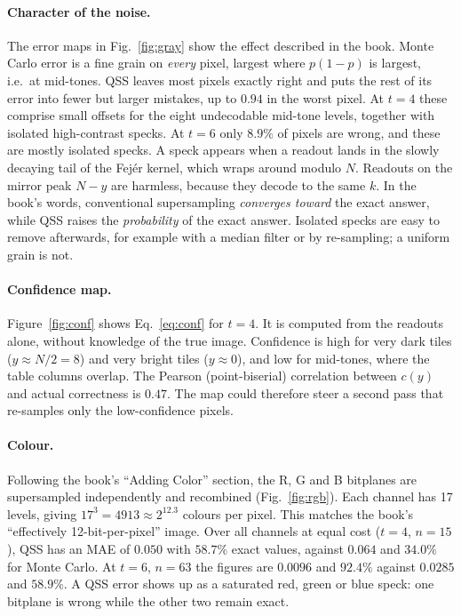 \documentclass[10pt,twocolumn,a4paper]{article}
\begin{document}
\paragraph{Character of the noise.}
The error maps in Fig.~\ref{fig:gray} show the effect described in the
book. Monte Carlo error is a fine grain on \emph{every} pixel, largest where
$p(1-p)$ is largest, i.e.\ at mid-tones. QSS leaves most pixels exactly right
and puts the rest of its error into fewer but larger mistakes, up to $0.94$
in the worst pixel. At $t=4$ these comprise small offsets for the eight
undecodable mid-tone levels, together with isolated high-contrast specks.
At $t=6$ only $8.9\%$ of pixels are wrong, and these are mostly isolated
specks. A speck appears when a readout lands in the slowly decaying tail of
the Fej\'er kernel, which wraps around modulo $N$. Readouts on the mirror peak
$N-y$ are harmless, because they decode to the same $k$.
In the book's words, conventional supersampling \emph{converges toward} the
exact answer, while QSS raises the \emph{probability} of the exact answer.
Isolated specks are easy to remove afterwards, for example with a median
filter or by re-sampling; a uniform grain is not.

\paragraph{Confidence map.}
Figure~\ref{fig:conf} shows Eq.~\eqref{eq:conf} for $t=4$. It is computed
from the readouts alone, without knowledge of the true image. Confidence is
high for very dark tiles ($y\approx N/2=8$) and very bright tiles
($y\approx0$), and low for mid-tones, where the table columns overlap. The
Pearson (point-biserial) correlation between $c(y)$ and actual correctness is
$0.47$. The map could therefore steer a second pass that re-samples only the
low-confidence pixels.

\paragraph{Colour.}
Following the book's ``Adding Color'' section, the R, G and B bitplanes are
supersampled independently and recombined (Fig.~\ref{fig:rgb}). Each channel
has 17 levels, giving $17^3=4913\approx2^{12.3}$ colours per pixel. This
matches the book's ``effectively 12-bit-per-pixel'' image. Over all channels at
equal cost ($t=4$, $n=15$), QSS has an MAE of $0.050$ with $58.7\%$ exact
values, against $0.064$ and $34.0\%$ for Monte Carlo. At $t=6$, $n=63$ the
figures are $0.0096$ and $92.4\%$ against $0.0285$ and $58.9\%$. A QSS error
shows up as a saturated red, green or blue speck: one bitplane is wrong while
the other two remain exact.
\end{document}
